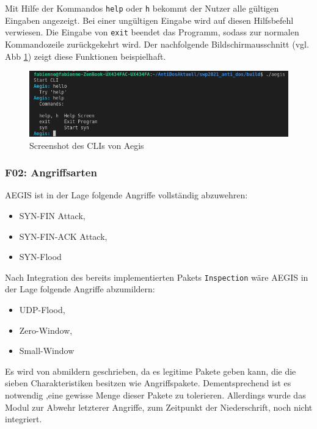 \documentclass[../review_3.tex]{subfiles}
\begin{document}
Mit Hilfe der Kommandos \texttt{help} oder \texttt{h} bekommt der Nutzer alle gültigen Eingaben angezeigt. Bei einer ungültigen Eingabe wird auf diesen Hilfsbefehl verwiesen. Die Eingabe von \texttt{exit} beendet das Programm, sodass zur normalen Kommandozeile zurückgekehrt wird. Der nachfolgende Bildschirmausschnitt (vgl. Abb \ref{cli}) zeigt diese Funktionen beispielhaft.

\begin{figure} [h]
    \centering
    \includegraphics[width = \linewidth, trim=0pt 0pt 0pt 2pt, clip]{img/CLIAegis.png}
    \caption{Screenshot des CLIs von Aegis}
    \label{cli}
\end{figure}


\subsubsection{F02: Angriffsarten}
AEGIS ist in der Lage folgende Angriffe vollständig abzuwehren:
\begin{itemize}
    \setlength{\parskip}{-2pt}
    \item SYN-FIN Attack,
    \item SYN-FIN-ACK Attack, 
    \item SYN-Flood
\end{itemize}

Nach Integration des bereits implementierten Pakets \texttt{Inspection} wäre AEGIS in der Lage folgende Angriffe abzumildern: 
\begin{itemize}
    \setlength{\parskip}{-2pt}
    \item UDP-Flood, 
    \item Zero-Window, 
    \item Small-Window
\end{itemize}

Es wird von abmildern geschrieben, da es legitime Pakete geben kann, die die sieben Charakteristiken besitzen wie Angriffspakete. Dementsprechend ist es notwendig ,eine gewisse Menge dieser Pakete zu tolerieren.
Allerdings wurde das Modul zur Abwehr letzterer Angriffe, zum Zeitpunkt der Niederschrift, noch nicht integriert.
\end{document}
